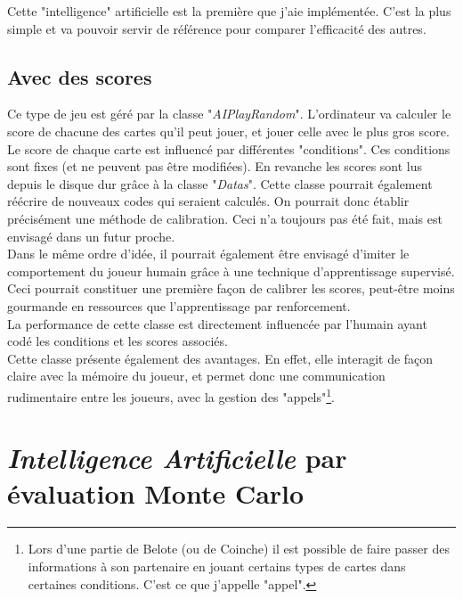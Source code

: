 \documentclass[a4paper,11pt]{article}
\begin{document}
Cette "intelligence" artificielle est la première que j'aie implémentée. C'est la plus simple et va pouvoir servir de référence pour comparer l'efficacité des autres.
\subsection{Avec des scores}
Ce type de jeu est géré par la classe "\textit{AIPlayRandom}". L'ordinateur va calculer le score de chacune des cartes qu'il peut jouer, et jouer celle avec le plus gros score. \\

Le score de chaque carte est influencé par différentes "conditions". Ces conditions sont fixes (et ne peuvent pas être modifiées). En revanche les scores sont lus depuis le disque dur grâce à la classe "\textit{Datas}". Cette classe pourrait également réécrire de nouveaux codes qui seraient calculés. On pourrait donc établir précisément une méthode de calibration. Ceci n'a toujours pas été fait, mais est envisagé dans un futur proche. \\
Dans le même ordre d'idée, il pourrait également être envisagé d'imiter le comportement du joueur humain grâce à une technique d'apprentissage supervisé. Ceci pourrait constituer une première façon de calibrer les scores, peut-être moins gourmande en ressources que l'apprentissage par renforcement. \\
La performance de cette classe est directement influencée par l'humain ayant codé les conditions et les scores associés.\\

Cette classe présente également des avantages. En effet, elle interagit de façon claire avec la mémoire du joueur, et permet donc une communication rudimentaire entre les joueurs, avec la gestion des "appels"\footnote{Lors d'une partie de Belote (ou de Coinche) il est possible de faire passer des informations à son partenaire en jouant certains types de cartes dans certaines conditions. C'est ce que j'appelle "appel".}. \\

\clearpage
\section{\textit{Intelligence Artificielle} par évaluation Monte Carlo \label{sec:MCPlay}}
\end{document}
